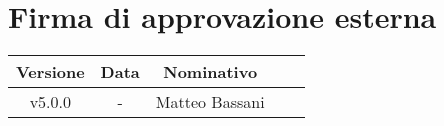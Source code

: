 \section*{Firma di approvazione esterna}
    \begin{table}[!ht]
        \centering
        \renewcommand{\arraystretch}{1.5}
        \begin{tabularx}{0.98\textwidth}
            {c c c >{\centering\arraybackslash}X X}
            \rowcolor{black}
            \textbf{\color{white} Versione} & \textbf{\color{white} Data} & \textbf{\color{white} Nominativo} & \multicolumn{2}{c}{\textbf{\color{white} Firma}}\\ 
            \hline
            
            \multirow{2}{*}{v5.0.0} &\multirow{2}{*}{-} &\multirow{2}{*}{Matteo Bassani} &&\\

            &&&\multicolumn{2}{c}{\hrulefill}\\
            \hline
        \end{tabularx}
    \end{table}